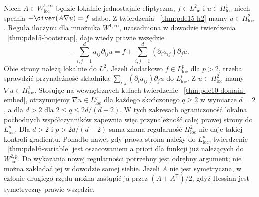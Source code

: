 \begin{uwaga}
Niech $A\in W^{1,\infty}_{\mathrm{loc}}$ będzie lokalnie
jednostajnie eliptyczna, $f\in L^2_{\mathrm{loc}}$ i
$u\in H^1_{\mathrm{loc}}$ niech spełnia
$-\diver(A\nabla u)=f$ słabo. Z twierdzenia
~\ref{thm:pde15-h2} mamy $u\in H^2_{\mathrm{loc}}$.
Reguła iloczynu dla mnożnika $W^{1,\infty}$,
uzasadniona w dowodzie twierdzenia
~\ref{thm:pde15-bootstrap}, daje wtedy prawie wszędzie
\[
 -\sum_{i,j=1}^d a_{ij}\partial_{ij}u
 =f+\sum_{i,j=1}^d(\partial_i a_{ij})\partial_j u .
\]
Obie strony należą lokalnie do $L^2$.
Jeżeli dodatkowo $f\in L^p_{\mathrm{loc}}$ dla $p>2$,
trzeba sprawdzić przynależność składnika
$\sum_{i,j}(\partial_i a_{ij})\partial_j u$
do $L^p_{\mathrm{loc}}$.
Z $u\in H^2_{\mathrm{loc}}$ mamy
$\nabla u\in H^1_{\mathrm{loc}}$.
Stosując na wewnętrznych kulach twierdzenie
~\ref{thm:pde10-domain-embed}, otrzymujemy
$\nabla u\in L^q_{\mathrm{loc}}$ dla każdego
skończonego $q\ge2$ w wymiarze $d=2$, a dla $d>2$
dla $2\le q\le 2d/(d-2)$.
W tych zakresach ograniczoność lokalna pochodnych
współczynników zapewnia więc przynależność całej
prawej strony do $L^p_{\mathrm{loc}}$.
Dla $d>2$ i $p>2d/(d-2)$ sama znana regularność
$H^2_{\mathrm{loc}}$ nie daje takiej kontroli gradientu.
Ponadto nawet gdy
prawa strona należy do $L^p_{\mathrm{loc}}$, twierdzenie
~\ref{thm:pde16-variable} jest oszacowaniem a priori
dla funkcji już należących do $W^{2,p}_{\mathrm{loc}}$.
Do wykazania nowej regularności potrzebny jest odrębny
argument; nie można zakładać jej w dowodzie samej siebie.
Jeżeli $A$ nie jest symetryczna, w członie drugiego
rzędu można zastąpić ją przez $(A+A^{\mathsf T})/2$,
gdyż Hessian jest symetryczny prawie wszędzie.
\end{uwaga}

